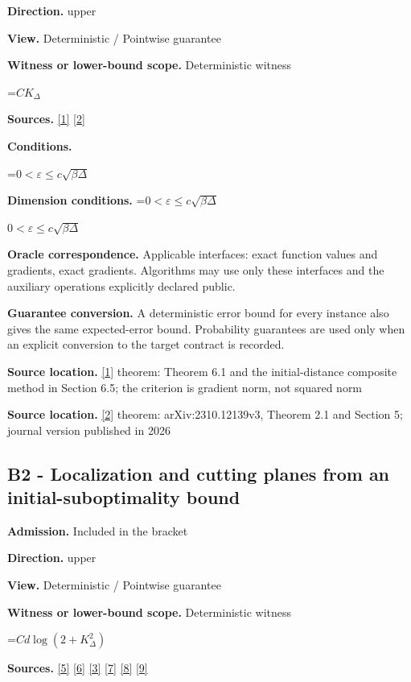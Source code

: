 \documentclass[10pt,a4paper]{article}
\newcommand{\AtlasMath}[1]{\par\begingroup\centering\setbox0=\hbox{$\displaystyle #1$}\ifdim\wd0>1.4\linewidth\typeout{ATLAS WIDE FORMULA: \the\wd0}\fi\ifdim\wd0>\linewidth\resizebox{\linewidth}{!}{\box0}\else\box0\fi\par\endgroup}
\newcommand{\AtlasInlineMath}[1]{\begingroup\setbox0=\hbox{$#1$}\ifdim\wd0>.4\linewidth\endgroup\AtlasMath{#1}\else\endgroup$#1$\fi}
\begin{document}
\textbf{Direction.} upper

\textbf{View.} Deterministic / Pointwise guarantee

\textbf{Witness or lower-bound scope.} Deterministic witness

\AtlasMath{CK_\Delta}
\textbf{Sources.} \href{https://arxiv.org/pdf/1803.06600v4}{[1]} \href{https://doi.org/10.1007/s10107-026-02352-2}{[2]}

\textbf{Conditions.} 
\AtlasMath{0<\varepsilon\le c\sqrt{\beta\Delta}}


\textbf{Dimension conditions.} \AtlasInlineMath{0<\varepsilon\le c\sqrt{\beta\Delta}}

\textbf{Oracle correspondence.} Applicable interfaces: exact function values and gradients, exact gradients. Algorithms may use only these interfaces and the auxiliary operations explicitly declared public.

\textbf{Guarantee conversion.} A deterministic error bound for every instance also gives the same expected-error bound. Probability guarantees are used only when an explicit conversion to the target contract is recorded.

\textbf{Source location.} \href{https://arxiv.org/pdf/1803.06600v4}{[1]} theorem: Theorem 6.1 and the initial-distance composite method in Section 6.5; the criterion is gradient norm, not squared norm

\textbf{Source location.} \href{https://doi.org/10.1007/s10107-026-02352-2}{[2]} theorem: arXiv:2310.12139v3, Theorem 2.1 and Section 5; journal version published in 2026

\subsection{B2 - Localization and cutting planes from an initial-suboptimality bound}
\textbf{Admission.} Included in the bracket

\textbf{Direction.} upper

\textbf{View.} Deterministic / Pointwise guarantee

\textbf{Witness or lower-bound scope.} Deterministic witness

\AtlasMath{C d\log(2+K_\Delta^2)}
\textbf{Sources.} \href{https://arxiv.org/pdf/2101.09740v2}{[5]} \href{https://arxiv.org/pdf/2609.33360v2}{[6]} \href{https://arxiv.org/pdf/2609.10874}{[3]} \href{https://arxiv.org/pdf/1405.4980}{[7]} \href{https://www2.isye.gatech.edu/~nemirovs/MOR_AccuracyCertificates.pdf}{[8]} \href{https://arxiv.org/pdf/2609.20701}{[9]}
\end{document}
